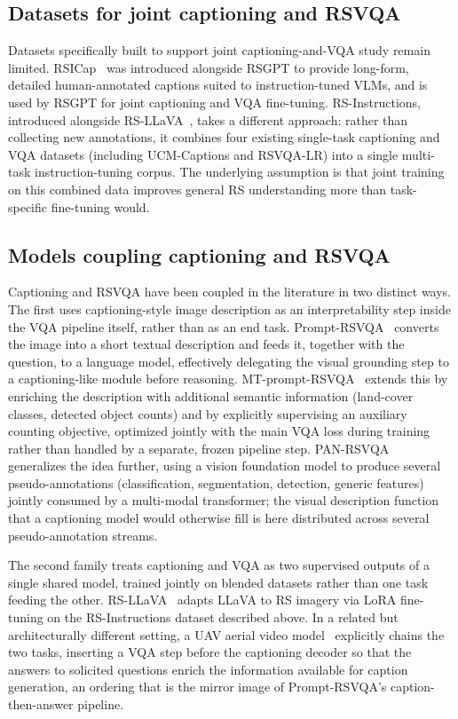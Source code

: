 \subsection{Datasets for joint captioning and RSVQA}
\label{sec:rw-captioning-datasets}

Datasets specifically built to support joint captioning-and-VQA study remain limited. RSICap~\cite{hu2023rsgpt} was introduced alongside RSGPT to provide long-form, detailed human-annotated captions suited to instruction-tuned VLMs, and is used by RSGPT for joint captioning and VQA fine-tuning. RS-Instructions, introduced alongside RS-LLaVA~\cite{diallo2024rsllava}, takes a different approach: rather than collecting new annotations, it combines four existing single-task captioning and VQA datasets (including UCM-Captions and RSVQA-LR) into a single multi-task instruction-tuning corpus. The underlying assumption is that joint training on this combined data improves general RS understanding more than task-specific fine-tuning would.

\subsection{Models coupling captioning and RSVQA}
\label{sec:rw-captioning-models}

Captioning and RSVQA have been coupled in the literature in two distinct ways. The first uses captioning-style image description as an interpretability step inside the VQA pipeline itself, rather than as an end task. Prompt-RSVQA~\cite{chappuis2022promptrsvqa} converts the image into a short textual description and feeds it, together with the question, to a language model, effectively delegating the visual grounding step to a captioning-like module before reasoning. MT-prompt-RSVQA~\cite{chappuis2023multitask} extends this by enriching the description with additional semantic information (land-cover classes, detected object counts) and by explicitly supervising an auxiliary counting objective, optimized jointly with the main VQA loss during training rather than handled by a separate, frozen pipeline step. PAN-RSVQA~\cite{chappuis2025pan} generalizes the idea further, using a vision foundation model to produce several pseudo-annotations (classification, segmentation, detection, generic features) jointly consumed by a multi-modal transformer; the visual description function that a captioning model would otherwise fill is here distributed across several pseudo-annotation streams.

The second family treats captioning and VQA as two supervised outputs of a single shared model, trained jointly on blended datasets rather than one task feeding the other. RS-LLaVA~\cite{diallo2024rsllava} adapts LLaVA to RS imagery via LoRA fine-tuning on the RS-Instructions dataset described above. In a related but architecturally different setting, a UAV aerial video model~\cite{uav2024videocaptioning} explicitly chains the two tasks, inserting a VQA step before the captioning decoder so that the answers to solicited questions enrich the information available for caption generation, an ordering that is the mirror image of Prompt-RSVQA's caption-then-answer pipeline.

